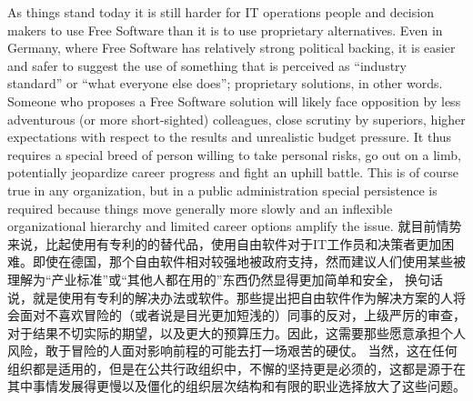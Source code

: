 As things stand today it is still harder for IT operations people and decision
makers to use Free Software than it is to use proprietary alternatives. Even in
Germany, where Free Software has relatively strong political backing, it is
easier and safer to suggest the use of something that is perceived as ``industry
standard'' or ``what everyone else does''; proprietary solutions, in other words.
Someone who proposes a Free Software solution will likely face opposition by
less adventurous (or more short-sighted) colleagues, close scrutiny by
superiors, higher expectations with respect to the results and unrealistic
budget pressure. It thus requires a special breed of person willing to take
personal risks, go out on a limb, potentially jeopardize career progress and
fight an uphill battle. This is of course true in any organization, but in a
public administration special persistence is required because things move
generally more slowly and an inflexible organizational hierarchy and limited
career options amplify the issue.
就目前情势来说，比起使用有专利的的替代品，使用自由软件对于IT工作员和决策者更加困难。即使在德国，那个自由软件相对较强地被政府支持，然而建议人们使用某些被理解为“产业标准”或“其他人都在用的”东西仍然显得更加简单和安全，
换句话说，就是使用有专利的解决办法或软件。那些提出把自由软件作为解决方案的人将会面对不喜欢冒险的（或者说是目光更加短浅的）同事的反对，上级严厉的审查，对于结果不切实际的期望，以及更大的预算压力。因此，这需要那些愿意承担个人风险，敢于冒险的人面对影响前程的可能去打一场艰苦的硬仗。
当然，这在任何组织都是适用的，但是在公共行政组织中，不懈的坚持更是必须的，这都是源于在其中事情发展得更慢以及僵化的组织层次结构和有限的职业选择放大了这些问题。

